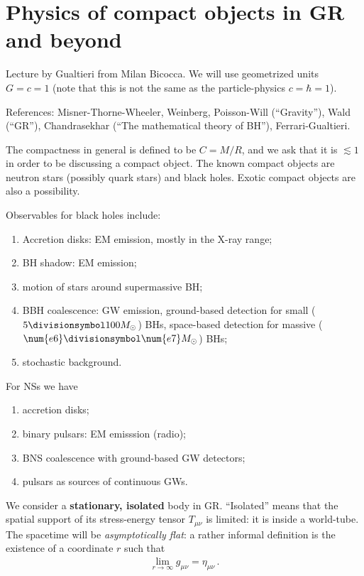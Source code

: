 \documentclass[main.tex]{subfiles}
\begin{document}
\section{Physics of compact objects in GR and beyond}


Lecture by Gualtieri from Milan Bicocca.
We will use geometrized units \(G = c = 1\) (note that this is not the same as the particle-physics \(c = \hbar = 1\)).

References: Misner-Thorne-Wheeler, Weinberg, Poisson-Will (``Gravity''), Wald (``GR''), Chandrasekhar (``The mathematical theory of BH''), Ferrari-Gualtieri.

The compactness in general is defined to be \(C = M / R\), and we ask that it is \(\lesssim 1\) in order to be discussing a compact object.
The known compact objects are neutron stars (possibly quark stars) and black holes. 
Exotic compact objects are also a possibility.

Observables for black holes include: 
\begin{enumerate}
    \item Accretion disks: EM emission, mostly in the X-ray range;
    \item BH shadow: EM emission;
    \item motion of stars around supermassive BH;
    \item BBH coalescence: GW emission, ground-based detection for small (\(5 \divisionsymbol 100 M_{\odot}\)) BHs, space-based detection for massive (\(\num{e6} \divisionsymbol \num{e7} M_{\odot}\)) BHs;
    \item stochastic background.
\end{enumerate}

For NSs we have 
\begin{enumerate}
    \item accretion disks;
    \item binary pulsars: EM emisssion (radio);
    \item BNS coalescence with ground-based GW detectors;
    \item pulsars as sources of continuous GWs.
\end{enumerate}

We consider a \textbf{stationary, isolated} body in GR. 
``Isolated'' means that the spatial support of its stress-energy tensor \(T_{\mu \nu }\) is limited: it is inside a world-tube. 
The spacetime will be \emph{asymptotically flat}: a rather informal definition is the existence of a coordinate \(r\) such that 
%
\begin{align}
\lim_{r \to \infty } g_{\mu \nu } = \eta_{\mu \nu }
\,.
\end{align}
\end{document}
